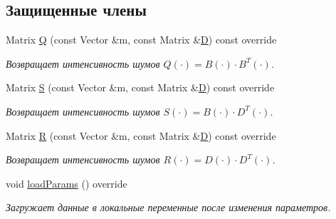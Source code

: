\subsection*{Защищенные члены}
\begin{DoxyCompactItemize}
\item 
\hypertarget{class_tasks_1_1_continuous_1_1_van_der_pol_linear_a69f80496b491d506987c50663918352d}{}\label{class_tasks_1_1_continuous_1_1_van_der_pol_linear_a69f80496b491d506987c50663918352d} 
Matrix \hyperlink{class_tasks_1_1_continuous_1_1_van_der_pol_linear_a69f80496b491d506987c50663918352d}{Q} (const Vector \&m, const Matrix \&\hyperlink{class_tasks_1_1_continuous_1_1_van_der_pol_linear_a07e8842a175006f214238a9f71e5ebdf}{D}) const override
\begin{DoxyCompactList}\small\item\em Возвращает интенсивность шумов $Q(\cdot) = B(\cdot) \cdot B^T(\cdot)$. \end{DoxyCompactList}\item 
Matrix \hyperlink{class_tasks_1_1_continuous_1_1_van_der_pol_linear_aa6cb67403faa3c2f894988aead527234}{S} (const Vector \&m, const Matrix \&\hyperlink{class_tasks_1_1_continuous_1_1_van_der_pol_linear_a07e8842a175006f214238a9f71e5ebdf}{D}) const override
\begin{DoxyCompactList}\small\item\em Возвращает интенсивность шумов $S(\cdot) = B(\cdot) \cdot D^T(\cdot)$. \end{DoxyCompactList}\item 
\hypertarget{class_tasks_1_1_continuous_1_1_van_der_pol_linear_a439da004e456566e378dd2b906dd232b}{}\label{class_tasks_1_1_continuous_1_1_van_der_pol_linear_a439da004e456566e378dd2b906dd232b} 
Matrix \hyperlink{class_tasks_1_1_continuous_1_1_van_der_pol_linear_a439da004e456566e378dd2b906dd232b}{R} (const Vector \&m, const Matrix \&\hyperlink{class_tasks_1_1_continuous_1_1_van_der_pol_linear_a07e8842a175006f214238a9f71e5ebdf}{D}) const override
\begin{DoxyCompactList}\small\item\em Возвращает интенсивность шумов $R(\cdot) = D(\cdot) \cdot D^T(\cdot)$. \end{DoxyCompactList}\item 
\hypertarget{class_tasks_1_1_continuous_1_1_van_der_pol_linear_ab85ed77a22e47a2f122548de31d56d6a}{}\label{class_tasks_1_1_continuous_1_1_van_der_pol_linear_ab85ed77a22e47a2f122548de31d56d6a} 
void \hyperlink{class_tasks_1_1_continuous_1_1_van_der_pol_linear_ab85ed77a22e47a2f122548de31d56d6a}{load\+Params} () override
\begin{DoxyCompactList}\small\item\em Загружает данные в локальные переменные после изменения параметров. \end{DoxyCompactList}\end{DoxyCompactItemize}
